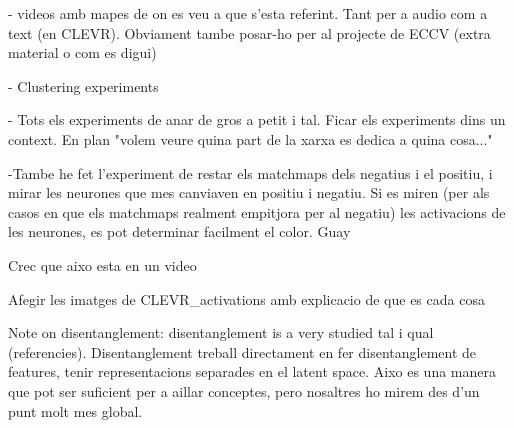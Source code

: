 - videos amb mapes de on es veu a que s'esta referint. Tant per a audio com a text (en CLEVR). Obviament tambe posar-ho per al projecte de ECCV (extra material o com es digui)

- Clustering experiments



- Tots els experiments de anar de gros a petit i tal. Ficar els experiments dins un context. En plan "volem veure quina part de la xarxa es dedica a quina cosa..."



-Tambe he fet l’experiment de restar els matchmaps dels negatius i el positiu, i mirar les neurones que mes canviaven en positiu i negatiu. Si es miren (per als casos en que els matchmaps realment empitjora per al negatiu) les activacions de les neurones, es pot determinar facilment el color. Guay

Crec que aixo esta en un video

Afegir les imatges de CLEVR\_activations amb explicacio de que es cada cosa

Note on disentanglement: disentanglement is a very studied tal i qual (referencies). Disentanglement treball directament en fer disentanglement de features, tenir representacions separades en el latent space. Aixo es una manera que pot ser suficient per a aillar conceptes, pero nosaltres ho mirem des d'un punt molt mes global.